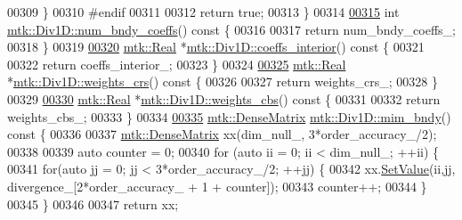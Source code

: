 \begin{DoxyCode}
{{00309   \}
00310 \textcolor{preprocessor}{  #endif}
00311 
00312   \textcolor{keywordflow}{return} \textcolor{keyword}{true};
00313 \}
00314 
\hypertarget{mtk__div__1d_8cc_source_l00315}{}\hyperlink{classmtk_1_1Div1D_a975cb2a91ed6806f6fc0a3a5b01b01b1}{00315} \textcolor{keywordtype}{int} \hyperlink{classmtk_1_1Div1D_a975cb2a91ed6806f6fc0a3a5b01b01b1}{mtk::Div1D::num\_bndy\_coeffs}()\textcolor{keyword}{ const }\{
00316 
00317   \textcolor{keywordflow}{return} num\_bndy\_coeffs\_;
00318 \}
00319 
\hypertarget{mtk__div__1d_8cc_source_l00320}{}\hyperlink{classmtk_1_1Div1D_a0916b5e84b019b4b6a33d0a45d829513}{00320} \hyperlink{group__c01-roots_gac080bbbf5cbb5502c9f00405f894857d}{mtk::Real} *\hyperlink{classmtk_1_1Div1D_a0916b5e84b019b4b6a33d0a45d829513}{mtk::Div1D::coeffs\_interior}()\textcolor{keyword}{ const }\{
00321 
00322   \textcolor{keywordflow}{return} coeffs\_interior\_;
00323 \}
00324 
\hypertarget{mtk__div__1d_8cc_source_l00325}{}\hyperlink{classmtk_1_1Div1D_ab5c791285e7e51a85b8c62a1b0ab9126}{00325} \hyperlink{group__c01-roots_gac080bbbf5cbb5502c9f00405f894857d}{mtk::Real} *\hyperlink{classmtk_1_1Div1D_ab5c791285e7e51a85b8c62a1b0ab9126}{mtk::Div1D::weights\_crs}()\textcolor{keyword}{ const }\{
00326 
00327   \textcolor{keywordflow}{return} weights\_crs\_;
00328 \}
00329 
\hypertarget{mtk__div__1d_8cc_source_l00330}{}\hyperlink{classmtk_1_1Div1D_a5d4fe8c61ce41cb1134a3f9cb16deb59}{00330} \hyperlink{group__c01-roots_gac080bbbf5cbb5502c9f00405f894857d}{mtk::Real} *\hyperlink{classmtk_1_1Div1D_a5d4fe8c61ce41cb1134a3f9cb16deb59}{mtk::Div1D::weights\_cbs}()\textcolor{keyword}{ const }\{
00331 
00332   \textcolor{keywordflow}{return} weights\_cbs\_;
00333 \}
00334 
\hypertarget{mtk__div__1d_8cc_source_l00335}{}\hyperlink{classmtk_1_1Div1D_a2c844ef39825e73e4024d35fcdd42b12}{00335} \hyperlink{classmtk_1_1DenseMatrix}{mtk::DenseMatrix} \hyperlink{classmtk_1_1Div1D_a2c844ef39825e73e4024d35fcdd42b12}{mtk::Div1D::mim\_bndy}()\textcolor{keyword}{ const }\{
00336 
00337   \hyperlink{classmtk_1_1DenseMatrix}{mtk::DenseMatrix} xx(dim\_null\_, 3*order\_accuracy\_/2);
00338 
00339   \textcolor{keyword}{auto} counter = 0;
00340   \textcolor{keywordflow}{for} (\textcolor{keyword}{auto} ii = 0; ii < dim\_null\_; ++ii) \{
00341     \textcolor{keywordflow}{for}(\textcolor{keyword}{auto} jj = 0; jj < 3*order\_accuracy\_/2; ++jj) \{
00342       xx.\hyperlink{classmtk_1_1DenseMatrix_a784ce5784109ac86bfb9d8562b334b13}{SetValue}(ii,jj, divergence\_[2*order\_accuracy\_ + 1 + counter]);
00343       counter++;
00344     \}
00345   \}
00346 
00347   \textcolor{keywordflow}{return} xx;
}}
\end{DoxyCode}
